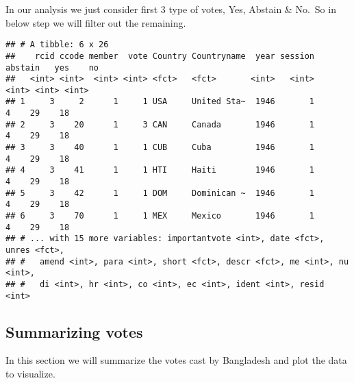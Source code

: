 \documentclass[
]{article}
\newenvironment{Shaded}{\begin{snugshade}}{\end{snugshade}}
\newcommand{\DataTypeTok}[1]{\textcolor[rgb]{0.13,0.29,0.53}{#1}}
\newcommand{\DecValTok}[1]{\textcolor[rgb]{0.00,0.00,0.81}{#1}}
\newcommand{\KeywordTok}[1]{\textcolor[rgb]{0.13,0.29,0.53}{\textbf{#1}}}
\newcommand{\NormalTok}[1]{#1}
\newcommand{\OperatorTok}[1]{\textcolor[rgb]{0.81,0.36,0.00}{\textbf{#1}}}
\newcommand{\StringTok}[1]{\textcolor[rgb]{0.31,0.60,0.02}{#1}}
\begin{document}
In our analysis we just consider first 3 type of votes, Yes, Abstain \&
No.~So in below step we will filter out the remaining.

\begin{Shaded}
\end{Shaded}

\begin{verbatim}
## # A tibble: 6 x 26
##    rcid ccode member  vote Country Countryname  year session abstain   yes    no
##   <int> <int>  <int> <int> <fct>   <fct>       <int>   <int>   <int> <int> <int>
## 1     3     2      1     1 USA     United Sta~  1946       1       4    29    18
## 2     3    20      1     3 CAN     Canada       1946       1       4    29    18
## 3     3    40      1     1 CUB     Cuba         1946       1       4    29    18
## 4     3    41      1     1 HTI     Haiti        1946       1       4    29    18
## 5     3    42      1     1 DOM     Dominican ~  1946       1       4    29    18
## 6     3    70      1     1 MEX     Mexico       1946       1       4    29    18
## # ... with 15 more variables: importantvote <int>, date <fct>, unres <fct>,
## #   amend <int>, para <int>, short <fct>, descr <fct>, me <int>, nu <int>,
## #   di <int>, hr <int>, co <int>, ec <int>, ident <int>, resid <int>
\end{verbatim}

\hypertarget{summarizing-votes}{%
\subsection{Summarizing votes}\label{summarizing-votes}}

In this section we will summarize the votes cast by Bangladesh and plot
the data to visualize.

\begin{Shaded}
\end{Shaded}
\end{document}
